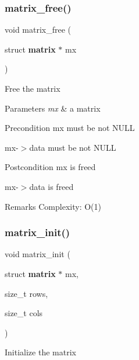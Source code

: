 \subsubsection{matrix\+\_\+free()}
{\footnotesize\ttfamily void matrix\+\_\+free (\begin{DoxyParamCaption}\item[{struct \textbf{ matrix} $\ast$}]{mx }\end{DoxyParamCaption})\hspace{0.3cm}{\ttfamily [inline]}}

Free the matrix


\begin{DoxyParams}{Parameters}
{\em mx} & a matrix\\
\hline
\end{DoxyParams}
\begin{DoxyPrecond}{Precondition}
{\ttfamily mx} must be not N\+U\+LL 

{\ttfamily mx-\/$>$data} must be not N\+U\+LL
\end{DoxyPrecond}
\begin{DoxyPostcond}{Postcondition}
{\ttfamily mx} is freed 

{\ttfamily mx-\/$>$data} is freed
\end{DoxyPostcond}
\begin{DoxyRemark}{Remarks}
Complexity\+: O(1) 
\end{DoxyRemark}
\mbox{\label{matrix_8c_a846b4db55574ffabe64ff0604070bde1}} 
\subsubsection{matrix\+\_\+init()}
{\footnotesize\ttfamily void matrix\+\_\+init (\begin{DoxyParamCaption}\item[{struct \textbf{ matrix} $\ast$}]{mx,  }\item[{size\+\_\+t}]{rows,  }\item[{size\+\_\+t}]{cols }\end{DoxyParamCaption})\hspace{0.3cm}{\ttfamily [inline]}}

Initialize the matrix


